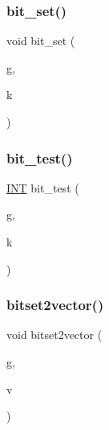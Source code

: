 \mbox{\label{global_8_c_adf5071052b9a46f2b8a6ae58dba32798}} 
\subsubsection{\texorpdfstring{bit\+\_\+set()}{bit\_set()}}
{\footnotesize\ttfamily void bit\+\_\+set (\begin{DoxyParamCaption}\item[{\mbox{\hyperlink{galois_8h_a72f3b9c93d14360be2ab10b2cd7f55ec}{U\+I\+NT}} \&}]{g,  }\item[{\mbox{\hyperlink{galois_8h_a09fddde158a3a20bd2dcadb609de11dc}{I\+NT}}}]{k }\end{DoxyParamCaption})}

\mbox{\label{global_8_c_a42fc794da6a188c1af7c64b5b1ea2b10}} 
\subsubsection{\texorpdfstring{bit\+\_\+test()}{bit\_test()}}
{\footnotesize\ttfamily \mbox{\hyperlink{galois_8h_a09fddde158a3a20bd2dcadb609de11dc}{I\+NT}} bit\+\_\+test (\begin{DoxyParamCaption}\item[{\mbox{\hyperlink{galois_8h_a72f3b9c93d14360be2ab10b2cd7f55ec}{U\+I\+NT}} \&}]{g,  }\item[{\mbox{\hyperlink{galois_8h_a09fddde158a3a20bd2dcadb609de11dc}{I\+NT}}}]{k }\end{DoxyParamCaption})}

\mbox{\label{global_8_c_a65e206c4fdb7b0be920dfcbb43cbfd60}} 
\subsubsection{\texorpdfstring{bitset2vector()}{bitset2vector()}}
{\footnotesize\ttfamily void bitset2vector (\begin{DoxyParamCaption}\item[{\mbox{\hyperlink{galois_8h_a72f3b9c93d14360be2ab10b2cd7f55ec}{U\+I\+NT}}}]{g,  }\item[{\mbox{\hyperlink{class_vector}{Vector}} \&}]{v }\end{DoxyParamCaption})}

